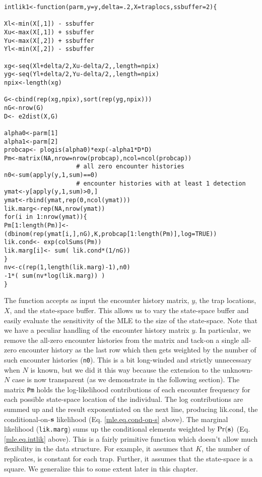 {\small 
\begin{verbatim}
intlik1<-function(parm,y=y,delta=.2,X=traplocs,ssbuffer=2){

Xl<-min(X[,1]) - ssbuffer 
Xu<-max(X[,1]) + ssbuffer
Yu<-max(X[,2]) + ssbuffer
Yl<-min(X[,2]) - ssbuffer

xg<-seq(Xl+delta/2,Xu-delta/2,,length=npix) 
yg<-seq(Yl+delta/2,Yu-delta/2,,length=npix) 
npix<-length(xg)

G<-cbind(rep(xg,npix),sort(rep(yg,npix)))
nG<-nrow(G)
D<- e2dist(X,G)  

alpha0<-parm[1]
alpha1<-parm[2]
probcap<- plogis(alpha0)*exp(-alpha1*D*D)
Pm<-matrix(NA,nrow=nrow(probcap),ncol=ncol(probcap))
                    # all zero encounter histories
n0<-sum(apply(y,1,sum)==0) 
                    # encounter histories with at least 1 detection
ymat<-y[apply(y,1,sum)>0,] 
ymat<-rbind(ymat,rep(0,ncol(ymat)))
lik.marg<-rep(NA,nrow(ymat))
for(i in 1:nrow(ymat)){
Pm[1:length(Pm)]<- (dbinom(rep(ymat[i,],nG),K,probcap[1:length(Pm)],log=TRUE))
lik.cond<- exp(colSums(Pm))
lik.marg[i]<- sum( lik.cond*(1/nG))  
}
nv<-c(rep(1,length(lik.marg)-1),n0)
-1*( sum(nv*log(lik.marg)) )
}
\end{verbatim}
}


The function accepts as
input the encounter history matrix, $y$, the trap locations, $X$, and the
state-space buffer. This allows us to vary the state-space buffer and
easily evaluate the sensitivity of the MLE to the size of the
state-space. 
Note that we have a peculiar handling of the encounter history
matrix $y$. In particular, we remove the all-zero encounter histories
from the matrix and tack-on a single all-zero encounter history as the
last row which then gets weighted by the number of such encounter
histories (\mbox{\tt n0}). This is a bit long-winded and strictly unnecessary
when $N$ is known, but we did it this way because the extension to the
unknown-$N$ case is now transparent (as we demonstrate in the following
section). 
 The matrix \mbox{\tt Pm} holds the log-likelihood contributions of
each encounter frequency for each possible state-space location of the
individual. 
The log contributions are summed up and the result
exponentiated on the next line, producing lik.cond, the
conditional-on-${\bf s}$ likelihood (Eq. \ref{mle.eq.cond-on-s}
above). The marginal
likelihood (\mbox{\tt lik.marg}) sums up the conditional elements weighted by
$\Pr({\bf s})$ (Eq. \ref{mle.eq.intlik} above).
This is a fairly primitive function which doesn't allow much
flexibility in the data structure. For example, it assumes that $K$,
the number 
of replicates, is constant for each trap. Further, it assumes that the
state-space is a square. We generalize this to some extent later in
this chapter. 

